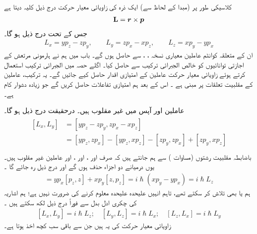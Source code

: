  کلاسیکی طور پر  (مبدا کے لحاظ سے)  ایک ذرہ کی زاویائی معیار حرکت درج ذیل کلیہ دیتا ہے 
\begin{align}
\operatorname{\mathbf{L}}={{\boldsymbol{r}}}\times{\ensuremath{{\boldsymbol{p}}}}
\end{align}
جس کے تحت درج ذیل ہو گا۔
\begin{align}\label{مساوات_تین_ابعادی_متعدد_رشتے}
L_{x}=yp_{z}-zp_{y}, \quad\quad L_{y}=zp_{x}-xp_{z}, \quad \quad L_{z}=xp_{y}-yp_{x}
\end{align}
ان کے متعلقہ کوانٹم عاملین معیاری نسخہ ، ،    سے حاصل ہوں گے۔ باب    میں ہم نے ہارمونی مرتعش کے اجازتی  توانائیوں کو خالص الجبرائی ترکیب سے حاصل کیا۔  اگلے  حصہ میں  الجبرائی ترکیب  استعمال کرتے ہوئے زاویائی معیار حرکت  عاملین کے امتیازی اقدار حاصل کیے جائیں گے۔ یہ ترکیب،  عاملین کے  مقلبیت  تعلقات پر مبنی ہے ۔ اس کے بعد ہم امتیازی تفاعلات حاصل کریں گے جو  زیادہ دشوار کام ہے۔

عاملین  اور  آپس میں غیر مقلوب  ہیں۔ درحقیقت درج ذیل ہو گا۔
\begin{gather}
\begin{aligned}
[L_{x},L_{y}]&=[yp_{z}-zp_{y},zp_{x}-xp_{z}]\\
&=[yp_{z},zp_{x}]-[yp_{z},xp_{z}]-[zp_{y},zp_{x}]+[zp_{y},xp_{z}]\\
\end{aligned}
\end{gather}
باضابطہ مقلبیت رشتوں  (مساوات )  سے ہم جانتے ہیں کہ صرف  اور ،   اور ،   اور  عاملین   غیر مقلوب ہیں۔  یوں درمیانے  دو اجزاء  حذف ہوں گے اور  درج ذیل  رہ جائے گا ۔
\begin{align}
[L_x, L_y] = y p_x [p_z, z] + x p_y [z, p_z] = i \hslash (x p_y - y p_x) = i \hslash L_z
\end{align}
ہم  یا  بھی تلاش کر سکتے تھے،  تاہم انہیں علیحدہ علیحدہ معلوم کرنے کی ضرورت نہیں ہے؛  ہم اشاریہ کی چکری   ادل بدل  سے فوراً درج ذیل لکھ سکتے ہیں ۔
\begin{align}\label{مساوات_تین_ابعادی_بنیادی_مقلبیت_رشتہ}
[L_x, L_y] = i \hslash L_z ; \quad [L_y, L_z] = i \hslash L_x ; \quad [L_z, L_x] = i \hslash L_y
\end{align}
زاویائی معیار حرکت کی یہ  ہیں جن سے باقی سب کچھ اخذ ہوتا ہے۔

